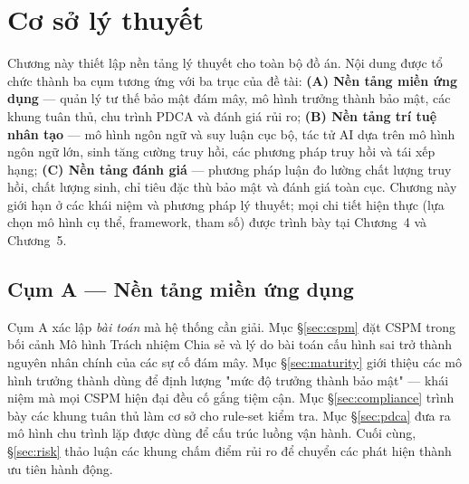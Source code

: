 %

\chapter{Cơ sở lý thuyết}
\label{ch:preliminary}

Chương này thiết lập nền tảng lý thuyết cho toàn bộ đồ án. Nội dung được tổ chức thành ba cụm tương ứng với ba trục của đề tài: \textbf{(A) Nền tảng miền ứng dụng} --- quản lý tư thế bảo mật đám mây, mô hình trưởng thành bảo mật, các khung tuân thủ, chu trình PDCA và đánh giá rủi ro; \textbf{(B) Nền tảng trí tuệ nhân tạo} --- mô hình ngôn ngữ và suy luận cục bộ, tác tử AI dựa trên mô hình ngôn ngữ lớn, sinh tăng cường truy hồi, các phương pháp truy hồi và tái xếp hạng; \textbf{(C) Nền tảng đánh giá} --- phương pháp luận đo lường chất lượng truy hồi, chất lượng sinh, chỉ tiêu đặc thù bảo mật và đánh giá toàn cục. Chương này giới hạn ở các khái niệm và phương pháp lý thuyết; mọi chi tiết hiện thực (lựa chọn mô hình cụ thể, framework, tham số) được trình bày tại Chương~4 và Chương~5.


\section*{Cụm A --- Nền tảng miền ứng dụng}

Cụm A xác lập \textit{bài toán} mà hệ thống cần giải. Mục §\ref{sec:cspm} đặt CSPM trong bối cảnh Mô hình Trách nhiệm Chia sẻ và lý do bài toán cấu hình sai trở thành nguyên nhân chính của các sự cố đám mây. Mục §\ref{sec:maturity} giới thiệu các mô hình trưởng thành dùng để định lượng "mức độ trưởng thành bảo mật" --- khái niệm mà mọi CSPM hiện đại đều cố gắng tiệm cận. Mục §\ref{sec:compliance} trình bày các khung tuân thủ làm cơ sở cho rule-set kiểm tra. Mục §\ref{sec:pdca} đưa ra mô hình chu trình lặp được dùng để cấu trúc luồng vận hành. Cuối cùng, §\ref{sec:risk} thảo luận các khung chấm điểm rủi ro để chuyển các phát hiện thành ưu tiên hành động.

